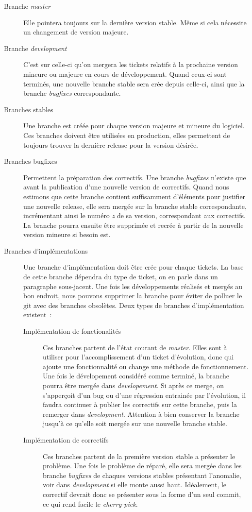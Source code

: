 \begin{description}
	\item[Branche \emph{master}]
		Elle pointera toujours sur la dernière version stable.
		Même si cela nécessite un changement de version majeure.
	\item[Branche \emph{development}]
		C'est sur celle-ci qu'on mergera les tickets relatifs à la prochaine version mineure ou majeure en cours de développement.
		Quand ceux-ci sont terminés, une nouvelle branche stable sera crée depuis celle-ci, ainsi que la branche \emph{bugfixes} correspondante.
	\item[Branches stables]
		Une branche est créée pour chaque version majeure et mineure du logiciel. Ces branches doivent être utilisées en production, elles permettent de toujours trouver la dernière release pour la version désirée.
	\item[Branches bugfixes]
		Permettent la préparation des correctifs.
		Une branche \emph{bugfixes} n'existe que avant la publication d'une nouvelle version de correctifs.
		Quand nous estimons que cette branche contient suffisamment d'éléments pour justifier une nouvelle release, elle sera mergée sur la branche stable correspondante, incrémentant ainsi le numéro \emph{z} de sa version, correspondant aux correctifs.
		La branche pourra ensuite être supprimée et recrée à partir de la nouvelle version mineure si besoin est.
	\item[Branches d'implémentations]
		Une branche d'implémentation doit être crée pour chaque tickets.
		La base de cette branche dépendra du type de ticket, on en parle dans un paragraphe sous-jacent.
		Une fois les développements réalisés et mergés au bon endroit, nous pouvons supprimer la branche pour éviter de polluer le git avec des branches obsolètes.
		Deux types de branches d'implémentation existent~:
		\begin{description}
			\item[Implémentation de fonctionalités]
				Ces branches partent de l'état courant de \emph{master}.
				Elles sont à utiliser pour l'accomplissement d'un ticket d'évolution, donc qui ajoute une fonctionnalité ou change une méthode de fonctionnement.
				Une fois le dévelopement considéré comme terminé, la branche pourra être mergée dans \emph{developement}.
				Si après ce merge, on s'apperçoit d'un bug ou d'une régression entrainée par l'évolution, il faudra continuer à publier les correctifs sur cette branche, puis la remerger dans \emph{development}.
				Attention à bien conserver la branche jusqu'à ce qu'elle soit mergée sur une nouvelle branche stable.
			\item[Implémentation de correctifs]
				Ces branches partent de la première version stable a présenter le problème.
				Une fois le problème de réparé, elle sera mergée dans les branche \emph{bugfixes} de chaques versions stables présentant l'anomalie, voir dans \emph{development} si elle monte aussi haut.
				Idéalement, le correctif devrait donc se présenter sous la forme d'un seul commit, ce qui rend facile le \emph{cherry-pick}.
		\end{description}
\end{description}

